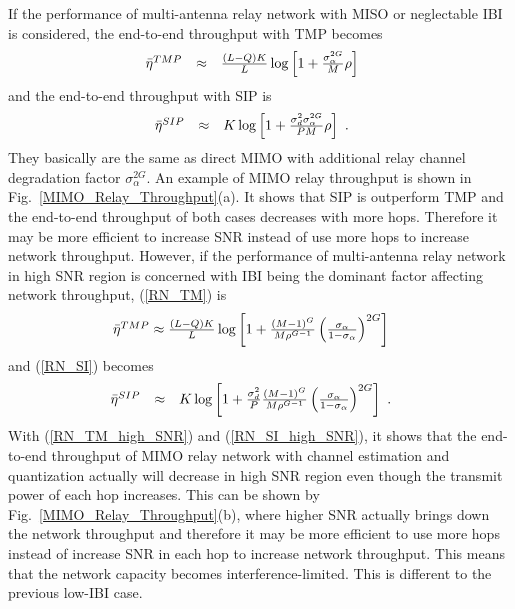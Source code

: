 \documentclass[10pt,fleqn, twocolumn]{IEEEtran}
\begin{document}
If the performance of multi-antenna relay network with MISO or
neglectable IBI is considered, the end-to-end throughput with TMP
becomes
\begin{equation}\hspace{-0.15in}
\begin{array}{rcl}
\bar\eta^{\mbox{\tiny
TMP}}&\approx&\frac{(L-Q)K}{L}\log\left[1+\frac{\sigma_{\alpha}^{2G}}{M}\rho\right]
\end{array}\label{RN_TM_MISO}
\end{equation}
\noindent and the end-to-end throughput with SIP is
\begin{equation}\hspace{-0.23in}
\begin{array}{rcl}
\bar\eta^{\mbox{\tiny
SIP}}&\approx&K\log\left[1+\frac{\sigma_{d}^{2}\sigma_{\alpha}^{2G}}{PM}\rho\right]
\end{array}.\label{RN_SI_MISO}
\end{equation}
\noindent They basically are the same as direct MIMO with
additional relay channel degradation factor
$\sigma_{\alpha}^{2G}$. An example of MIMO relay throughput is
shown in Fig.~\ref{MIMO_Relay_Throughput}(a). It shows that SIP is
outperform TMP and the end-to-end throughput of both cases
decreases with more hops. Therefore it may be more efficient to
increase SNR instead of use more hops to increase network
throughput. However, if the performance of multi-antenna relay
network in high SNR region is concerned with IBI being the
dominant factor affecting network throughput, (\ref{RN_TM}) is
\begin{equation}\hspace{-0.18in}
\begin{array}{l}
\bar\eta^{\mbox{\tiny
TMP}}\approx\frac{(L-Q)K}{L}\log\left[1+\frac{(M-1)^{G}}{M\rho^{G-1}}\left(\frac{\sigma_{\alpha}}{1-\sigma_{\alpha}}\right)^{2G}\right]
\end{array}\label{RN_TM_high_SNR}
\end{equation}
\noindent and (\ref{RN_SI}) becomes
\begin{equation}\hspace{-0.23in}
\begin{array}{rcl}
\bar\eta^{\mbox{\tiny
SIP}}&\approx&K\log\left[1+\frac{\sigma_{d}^{2}}{P}\frac{(M-1)^{G}}{M\rho^{G-1}}\left(\frac{\sigma_{\alpha}}{1-\sigma_{\alpha}}\right)^{2G}\right]
\end{array}.\label{RN_SI_high_SNR}
\end{equation}
With (\ref{RN_TM_high_SNR}) and (\ref{RN_SI_high_SNR}), it shows
that the end-to-end throughput of MIMO relay network with channel
estimation and quantization actually will decrease in high SNR
region even though the transmit power of each hop increases. This
can be shown by Fig.~\ref{MIMO_Relay_Throughput}(b), where higher
SNR actually brings down the network throughput and therefore it
may be more efficient to use more hops instead of increase SNR in
each hop to increase network throughput. This means that the
network capacity becomes interference-limited. This is different
to the previous low-IBI case.
\end{document}

